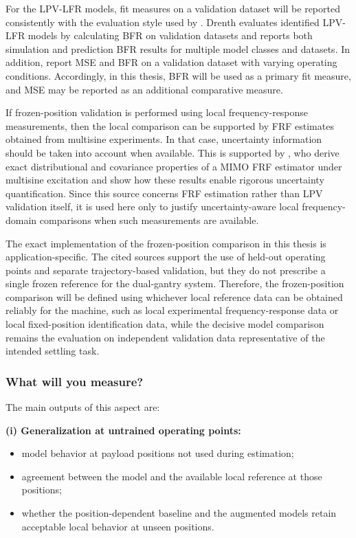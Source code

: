 For the LPV-LFR models, fit measures on a validation dataset will be reported consistently with the evaluation style used by \citet{drenth2025thesis}. Drenth evaluates identified LPV-LFR models by calculating BFR on validation datasets and reports both simulation and prediction BFR results for multiple model classes and datasets. In addition, \citet{bachnas2014review} report MSE and BFR on a validation dataset with varying operating conditions. Accordingly, in this thesis, BFR will be used as a primary fit measure, and MSE may be reported as an additional comparative measure.

If frozen-position validation is performed using local frequency-response measurements, then the local comparison can be supported by FRF estimates obtained from multisine experiments. In that case, uncertainty information should be taken into account when available. This is supported by \citet{gonzalez2025finite}, who derive exact distributional and covariance properties of a MIMO FRF estimator under multisine excitation and show how these results enable rigorous uncertainty quantification. Since this source concerns FRF estimation rather than LPV validation itself, it is used here only to justify uncertainty-aware local frequency-domain comparisons when such measurements are available.

The exact implementation of the frozen-position comparison in this thesis is application-specific. The cited sources support the use of held-out operating points and separate trajectory-based validation, but they do not prescribe a single frozen reference for the dual-gantry system. Therefore, the frozen-position comparison will be defined using whichever local reference data can be obtained reliably for the machine, such as local experimental frequency-response data or local fixed-position identification data, while the decisive model comparison remains the evaluation on independent validation data representative of the intended settling task.

\subsubsection{What will you measure?}

The main outputs of this aspect are:

\textbf{(i) Generalization at untrained operating points:}
\begin{itemize}
    \item model behavior at payload positions not used during estimation;
    \item agreement between the model and the available local reference at those positions;
    \item whether the position-dependent baseline and the augmented models retain acceptable local behavior at unseen positions.
\end{itemize}

